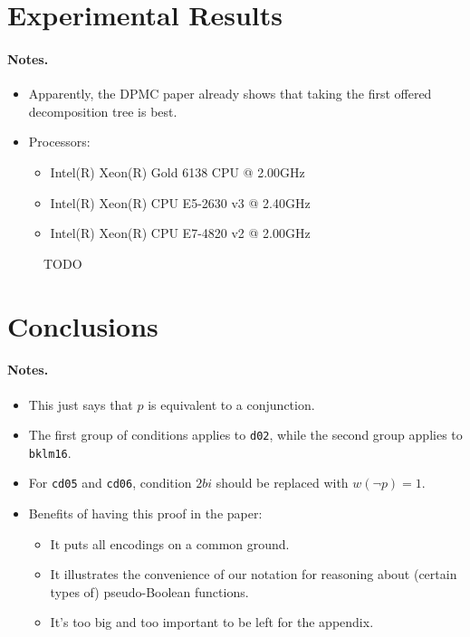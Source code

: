 \documentclass[runningheads]{llncs}
\begin{document}
\section{Experimental Results}

\paragraph{Notes.}
\begin{itemize}
\item Apparently, the \textsc{DPMC} paper \cite{DBLP:conf/cp/DudekPV20} already
  shows that taking the first offered decomposition tree is best.
\item Processors:
  \begin{itemize}
  \item Intel(R) Xeon(R) Gold 6138 CPU @ 2.00GHz
  \item Intel(R) Xeon(R) CPU E5-2630 v3 @ 2.40GHz
  \item Intel(R) Xeon(R) CPU E7-4820 v2 @ 2.00GHz
  \end{itemize}
\end{itemize}

\begin{figure}[t]
  \centering
  \caption{TODO}
  \label{fig:cumulative}
\end{figure}

\section{Conclusions}

\paragraph{Notes.}
\begin{itemize}
\item This just says that $p$ is equivalent to a conjunction.
\item The first group of conditions applies to \texttt{d02}, while the second
  group applies to \texttt{bklm16}.
\item For \texttt{cd05} and \texttt{cd06}, condition $2bi$ should be replaced
  with $w(\neg p) = 1$.
\item Benefits of having this proof in the paper:
  \begin{itemize}
  \item It puts all encodings on a common ground.
  \item It illustrates the convenience of our notation for reasoning about
    (certain types of) pseudo-Boolean functions.
  \item It's too big and too important to be left for the appendix.
  \end{itemize}
\end{itemize}
\end{document}
